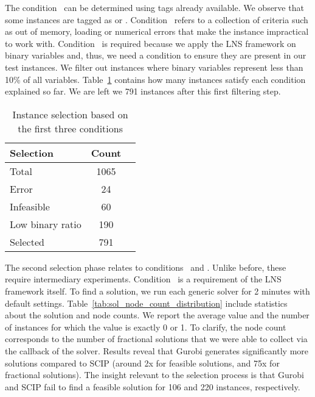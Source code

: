 \documentclass[3p, authoryear, times]{elsarticle}
\begin{document}
The condition~ can be determined using tags already available. We observe that some instances are tagged as  or . Condition~ refers to a collection of criteria such as out of memory, loading or numerical errors that make the instance impractical to work with. Condition~ is required because we apply the LNS framework on binary variables and, thus, we need a condition to ensure they are present in our test instances. We filter out instances where binary variables represent less than 10\% of all variables. Table~\ref{tab:instance_selection} contains how many instances satisfy each condition explained so far. We are left we 791 instances after this first filtering step. 

 \begin{table}[h]
\centering
\caption{Instance selection based on the first three conditions}
\label{tab:instance_selection}
\begin{tabular}{lcc}
\toprule
{Selection} & {Count} \\
\midrule
Total & 1065 \\
Error & 24 \\
Infeasible & 60 \\
Low binary ratio & 190 \\
Selected & 791 \\
\bottomrule
\end{tabular}
\end{table}


 The second selection phase relates to conditions~ and . Unlike before, these require intermediary experiments. Condition~ is a requirement of the LNS framework itself. To find a solution, we run each generic solver for 2 minutes with default settings. Table~\ref{tab:sol_node_count_distribution} include statistics about the solution and node counts. We report the average value and the number of instances for which the value is exactly 0 or 1. To clarify, the node count corresponds to the number of fractional solutions that we were able to collect via the callback of the solver. Results reveal that Gurobi generates significantly more solutions compared to SCIP (around 2x for feasible solutions, and 75x for fractional solutions). The insight relevant to the selection process is that Gurobi and SCIP fail to find a feasible solution for 106 and 220 instances, respectively. 
\end{document}
